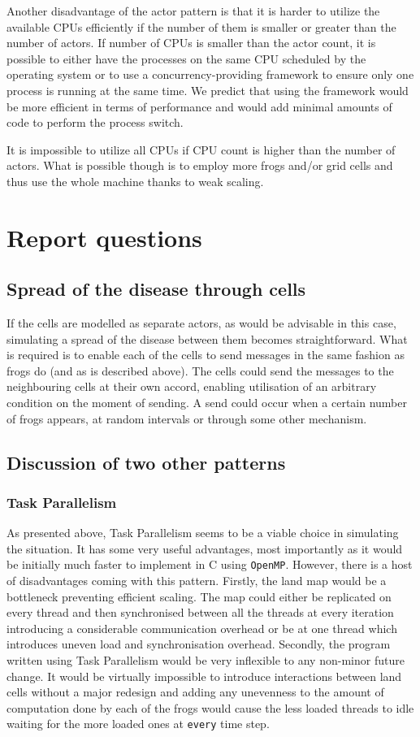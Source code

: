 \documentclass[11pt,a4paper]{article}
\begin{document}
Another disadvantage of the actor pattern is that it is harder to utilize the available CPUs efficiently if the number of them is smaller or greater than the number of actors.
If number of CPUs is smaller than the actor count, it is possible to either have the processes on the same CPU scheduled by the operating system or to use a concurrency-providing framework to ensure only one process is running at the same time.
We predict that using the framework would be more efficient in terms of performance and would add minimal amounts of code to perform the process switch.

It is impossible to utilize all CPUs if CPU count is higher than the number of actors.
What is possible though is to employ more frogs and/or grid cells and thus use the whole machine thanks to weak scaling.

\section{Report questions}
\subsection{Spread of the disease through cells}
If the cells are modelled as separate actors, as would be advisable in this case, simulating a spread of the disease between them becomes straightforward.
What is required is to enable each of the cells to send messages in the same fashion as frogs do (and as is described above).
The cells could send the messages to the neighbouring cells at their own accord, enabling utilisation of an arbitrary condition on the moment of sending.
A send could occur when a certain number of frogs appears, at random intervals or through some other mechanism.

\subsection{Discussion of two other patterns}
\subsubsection{Task Parallelism}
As presented above, Task Parallelism seems to be a viable choice in simulating the situation.
It has some very useful advantages, most importantly as it would be initially much faster to implement in C using \texttt{OpenMP}.
However, there is a host of disadvantages coming with this pattern.
Firstly, the land map would be a bottleneck preventing efficient scaling.
The map could either be replicated on every thread and then synchronised between all the threads at every iteration introducing a considerable communication overhead or be at one thread which introduces uneven load and synchronisation overhead.
Secondly, the program written using Task Parallelism would be very inflexible to any non-minor future change.
It would be virtually impossible to introduce interactions between land cells without a major redesign and adding any unevenness to the amount of computation done by each of the frogs would cause the less loaded threads to idle waiting for the more loaded ones at \texttt{every} time step.
\end{document}
